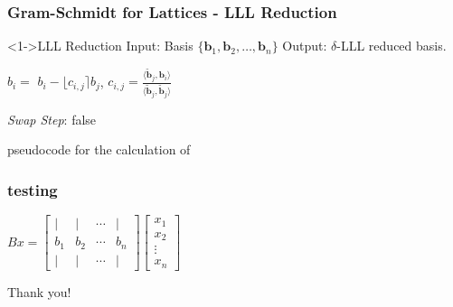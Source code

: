 \documentclass{beamer}
\begin{document}
\begin{frame}
    \frametitle{Gram-Schmidt for Lattices - LLL Reduction}
    \begin{block}<1->{LLL Reduction}
        Input: Basis $\{ \mathbf{b}_1, \mathbf{b}_2, \dots , \mathbf{b}_n \} $
        Output: $\delta$-LLL reduced basis.
    \end{block}
    \begin{algorithm}[H]
    \begin{algorithmic}[1]
    \STATE $b_i =$ $b_i - \lfloor c_{i, j} \rceil b_j$, $c_{i, j} = \frac{\langle \tilde{\mathbf{b}}_j, \mathbf{b}_i \rangle}{\langle \tilde{\mathbf{b}}_j, \tilde{\mathbf{b}}_j \rangle}$
    \ENDFOR

    \STATE \emph{Swap Step}:
     \RETURN false
    \ENDIF

    \ENDFOR

    \end{algorithmic}
    \caption{pseudocode for the calculation of }
    \label{alg:seq}
    \end{algorithm}

\end{frame}
\begin{frame}
    \frametitle{testing}
    \begin{center}
    $Bx = 
      \begin{bmatrix}
            | & | & \cdots & |\\
            b_1 & b_2 & \cdots & b_n \\
            | & | & \cdots & |
     \end{bmatrix}
     \begin{bmatrix}
        x_1\\
        x_2\\
        \vdots \\
        x_n 
    \end{bmatrix}$
    \end{center}
\end{frame}


\begin{frame}
\Huge{\centerline{Thank you!}}
\end{frame}
\end{document}
